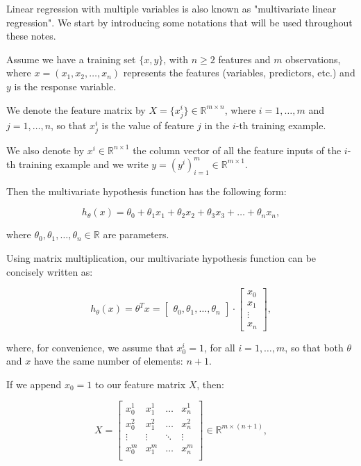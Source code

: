 \documentclass[a4paper,11pt]{report}
\begin{document}
Linear regression with multiple variables is also known as "multivariate linear regression".
We start by introducing some notations that will be used throughout these notes.

Assume we have a training set $\{x, y\}$, with $n \geq 2$ features and $m$ observations, where $x = (x_1, x_2, \ldots, x_n)$ represents the features (variables, predictors, etc.) and $y $ is the response variable.

We denote the feature matrix by $X = \{x_j^i\}\in\mathbb{R}^{m\times n}$, where $i=1,\ldots, m$ and $j=1,\ldots, n$, so that $x_j^i$ is the value of feature $j$ in the $i$-th training example.

We also denote by $x^{i}\in\mathbb{R}^{n\times 1}$ the column vector of all the feature inputs of the $i$-th training example and we write $y = (y^i)_{i=1}^{m}\in\mathbb{R}^{m\times 1}$.

Then the multivariate hypothesis function has the following form:

\begin{equation}\label{eq:mul-reg-hyp}
h_\theta (x) = \theta_0 + \theta_1 x_1 + \theta_2 x_2 + \theta_3 x_3 + \ldots + \theta_n x_n,
\end{equation}

where $\theta_0, \theta_1, \ldots, \theta_n \in \mathbb{R}$ are parameters.

Using matrix multiplication, our multivariate hypothesis function can be concisely written as:

\begin{equation}\label{eq:mul-reg-hyp-vec}
h_\theta(x) = \theta^T x = \begin{bmatrix}\theta_0, \theta_1,\ldots, \theta_n \end{bmatrix} \cdot \begin{bmatrix}x_0 \\ x_1 \\ \vdots \\ x_n \end{bmatrix},
\end{equation}

where, for convenience, we assume that $x^i_0 = 1$, for all $i= 1, \ldots, m$, so that both $\theta$ and $x$ have the same number of elements: $n+1$.

If we append $x_0 = 1$ to our feature matrix $X$, then:

\begin{equation*}
X = \begin{bmatrix}
x^{1}_0 & x^{1}_1 & \ldots & x^{1}_n  \\
x^{2}_0 & x^{2}_1 & \ldots & x^{2}_n  \\
\vdots  & \vdots  & \ddots & \vdots \\
x^{m}_0 & x^{m}_1 & \ldots & x^{m}_n  \\
\end{bmatrix}\in\mathbb{R}^{m \times (n+1)},
\end{equation*}
\end{document}
